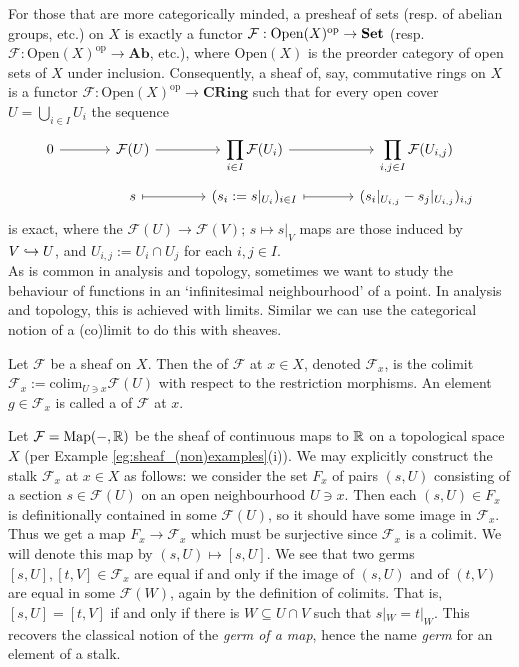 For those that are more categorically minded, a presheaf of sets (resp. of abelian groups, etc.) on $X$ is exactly a functor $\mathcal{F}:\mathrm{Open}(X)^\text{op} \to \mathbf{Set}$ (resp. $\mathcal{F}:\mathrm{Open}(X)^\text{op} \to \mathbf{Ab}$, etc.), where $\mathrm{Open}(X)$ is the preorder category of open sets of $X$ under inclusion. Consequently, a sheaf of, say, commutative rings on $X$ is a functor $\mathcal{F} : \mathrm{Open}(X)^\text{op} \to \mathbf{CRing}$ such that for every open cover $U = \bigcup_{i \in I} U_i$ the sequence
\[
	\begin{tikzcd}[column sep=large, row sep=tiny]
		0 \rar & \mathcal{F}(U) \rar & {\displaystyle \prod_{i \in I} \mathcal{F}(U_i)} \rar & {\displaystyle \prod_{i,j \in I} \mathcal{F}(U_{i,j})}\\
		& s \rar[mapsto] &(s_i := s|_{U_i})_{i \in I} \rar[mapsto] & (s_i|_{U_{i,j}} - s_j|_{U_{i,j}})_{i,j}
	\end{tikzcd}
\]
is exact, where the $\mathcal{F}(U) \to \mathcal{F}(V);\, s \mapsto s|_V$ maps are those induced by $V \hookrightarrow U$, and $U_{i,j} := U_i \cap U_j$ for each $i,j \in I$. \\

As is common in analysis and topology, sometimes we want to study the behaviour of functions in an `infinitesimal neighbourhood' of a point. In analysis and topology, this is achieved with limits. Similar we can use the categorical notion of a (co)limit to do this with sheaves.

\begin{defn}
	Let $\mathcal{F}$ be a sheaf on $X$. Then the  of $\mathcal{F}$ at $x \in X$, denoted $\mathcal{F}_x$, is the colimit $\mathcal{F}_x := \mathrm{colim}_{U \ni x} \mathcal{F}(U)$ with respect to the restriction morphisms. An element $g \in \mathcal{F}_x$ is called a  of $\mathcal{F}$ at $x$.
\end{defn}

\begin{eg}
	Let $\mathcal{F} = \mathrm{Map}(-, \mathbb{R})$ be the sheaf of continuous maps to $\mathbb{R}$ on a topological space $X$ (per Example \ref{eg:sheaf_(non)examples}(i)). We may explicitly construct the stalk $\mathcal{F}_x$ at $x \in X$ as follows: we consider the set $F_x$ of pairs $(s, U)$ consisting of a section $s \in \mathcal{F}(U)$ on an open neighbourhood $U \ni x$. Then each $(s, U) \in F_x$ is definitionally contained in some $\mathcal{F}(U)$, so it should have some image in $\mathcal{F}_x$. Thus we get a map $F_x \to \mathcal{F}_x$ which must be surjective since $\mathcal{F}_x$ is a colimit. We will denote this map by $(s, U) \mapsto [s, U]$. We see that two germs $[s, U], [t, V] \in \mathcal{F}_x$ are equal if and only if the image of $(s,U)$ and of $(t, V)$ are equal in some $\mathcal{F}(W)$, again by the definition of colimits. That is, $[s, U] = [t, V]$ if and only if there is $W \subseteq U \cap V$ such that $s|_W = t|_W$. This recovers the classical notion of the \emph{germ of a map}, hence the name \emph{germ} for an element of a stalk.
\end{eg}

